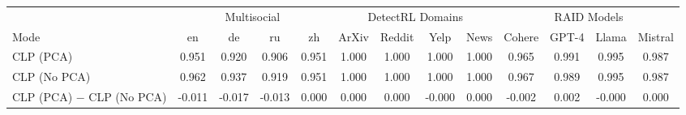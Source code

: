 \begin{tabular}{lcccccccccccc}
\toprule
 & \multicolumn{4}{c}{Multisocial} & \multicolumn{4}{c}{DetectRL Domains} & \multicolumn{4}{c}{RAID Models} \\
\cmidrule(lr){2-5} \cmidrule(lr){6-9} \cmidrule(lr){10-13}
Mode & en & de & ru & zh & ArXiv & Reddit & Yelp & News & Cohere & GPT-4 & Llama & Mistral \\
\midrule
CLP (PCA) & 0.951 & 0.920 & 0.906 & 0.951 & 1.000 & 1.000 & 1.000 & 1.000 & 0.965 & 0.991 & 0.995 & 0.987 \\
CLP (No PCA) & 0.962 & 0.937 & 0.919 & 0.951 & 1.000 & 1.000 & 1.000 & 1.000 & 0.967 & 0.989 & 0.995 & 0.987 \\
\midrule
CLP (PCA) $-$ CLP (No PCA) & -0.011 & -0.017 & -0.013 & 0.000 & 0.000 & 0.000 & -0.000 & 0.000 & -0.002 & 0.002 & -0.000 & 0.000 \\
\bottomrule
\end{tabular}
